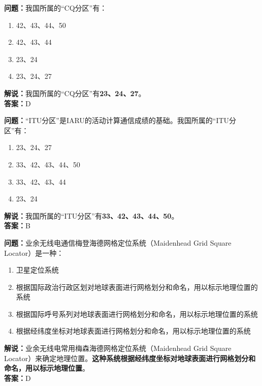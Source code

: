 \documentclass{ctexbook}
\begin{document}
\noindent\textbf{问题：}我国所属的“CQ分区”有：

\begin{enumerate}[label=\Alph*), leftmargin=3em]
	\item 42、43、44、50
	\item 42、43、44
	\item 23、24
	\item 23、24、27
\end{enumerate}

\noindent\textbf{解说：}我国所属的“CQ分区”有\textbf{23、24、27}。\\\noindent\textbf{答案：}D


\bigskip


\noindent\textbf{问题：}“ITU分区”是IARU的活动计算通信成绩的基础。我国所属的“ITU分区”有：

\begin{enumerate}[label=\Alph*), leftmargin=3em]
	\item 23、24、27
	\item 33、42、43、44、50
	\item 33、42、43、44
	\item 23、24
\end{enumerate}

\noindent\textbf{解说：}我国所属的“ITU分区”有\textbf{33、42、43、44、50}。\\\noindent\textbf{答案：}B


\bigskip


\noindent\textbf{问题：}业余无线电通信梅登海德网格定位系统（Maidenhead Grid Square Locator）是一种：

\begin{enumerate}[label=\Alph*), leftmargin=3em]
	\item 卫星定位系统
	\item 根据国际政治行政区划对地球表面进行网格划分和命名，用以标示地理位置的系统
	\item 根据国际呼号系列对地球表面进行网格划分和命名，用以标示地理位置的系统
	\item 根据经纬度坐标对地球表面进行网格划分和命名，用以标示地理位置的系统
\end{enumerate}

\noindent\textbf{解说：}业余无线电常用梅森海德网格定位系统（Maidenhead Grid Square Locator）来确定地理位置。\textbf{这种系统根据经纬度坐标对地球表面进行网格划分和命名，用以标示地理位置}。\\\noindent\textbf{答案：}D


\bigskip
\end{document}
